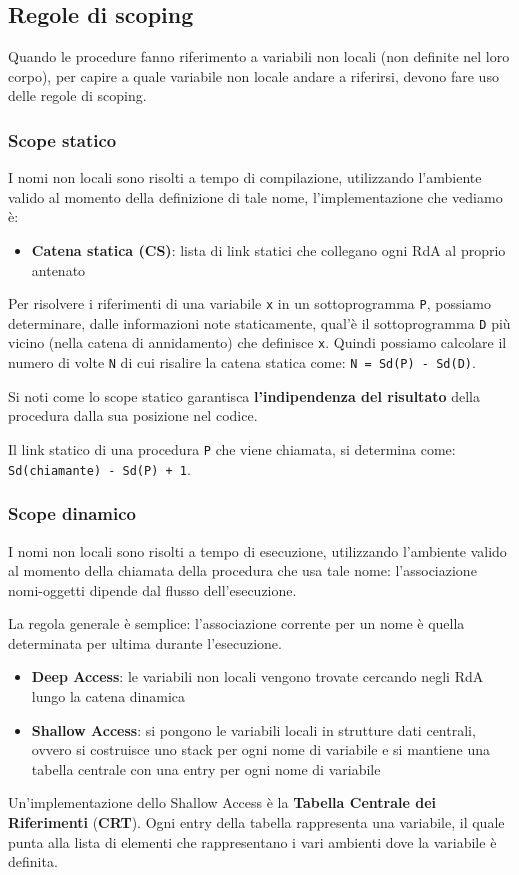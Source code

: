 \documentclass[12pt,a4paper]{article}
\begin{document}
\subsection{Regole di scoping} \label{regoleScoping}
Quando le procedure fanno riferimento a variabili non locali (non definite nel loro corpo), per capire a quale variabile non locale andare a riferirsi, devono fare uso delle regole di scoping.
\subsubsection{Scope statico}
I nomi non locali sono risolti a tempo di compilazione, utilizzando l'ambiente valido al momento della definizione di tale nome, l'implementazione che vediamo è:
\begin{itemize}
\item \textbf{Catena statica (CS)}: lista di link statici che collegano ogni RdA al proprio antenato
\end{itemize}
Per risolvere i riferimenti di una variabile \texttt{x} in un sottoprogramma \texttt{P}, possiamo determinare, dalle informazioni note staticamente, qual'è il sottoprogramma \texttt{D} più vicino (nella catena di annidamento) che definisce \texttt{x}. Quindi possiamo calcolare il numero di volte \texttt{N} di cui risalire la catena statica come: \texttt{N = Sd(P) - Sd(D)}.

Si noti come lo scope statico garantisca \textbf{l'indipendenza del risultato} della procedura dalla sua posizione nel codice.

Il link statico di una procedura \texttt{P} che viene chiamata, si determina come: \texttt{Sd(chiamante) - Sd(P) + 1}.

\subsubsection{Scope dinamico}
I nomi non locali sono risolti a tempo di esecuzione, utilizzando l'ambiente valido al momento della chiamata della procedura che usa tale nome: l'associazione nomi-oggetti dipende dal flusso dell'esecuzione.

La regola generale è semplice: l'associazione corrente per un nome è quella determinata per ultima durante l'esecuzione.
\begin{itemize}
\item \textbf{Deep Access}: le variabili non locali vengono trovate cercando negli RdA lungo la catena dinamica
\item \textbf{Shallow Access}: si pongono le variabili locali in strutture dati centrali, ovvero si costruisce uno stack per ogni nome di variabile e si mantiene una tabella centrale con una entry per ogni nome di variabile
\end{itemize}
Un'implementazione dello Shallow Access è la \textbf{Tabella Centrale dei Riferimenti} (\textbf{CRT}).
Ogni entry della tabella rappresenta una variabile, il quale punta alla lista di elementi che rappresentano i vari ambienti dove la variabile è definita.
\end{document}
